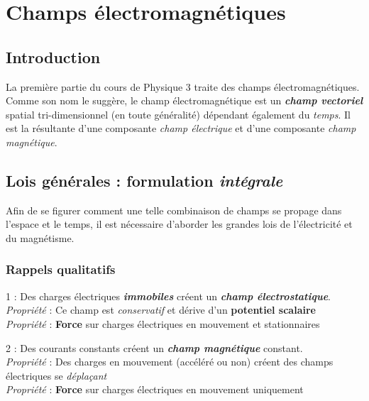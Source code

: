 
\chapter{Champs électromagnétiques} 

 
\section{Introduction}

La première partie du cours de Physique 3 traite des champs électromagnétiques. \\
Comme son nom le suggère, le champ électromagnétique est un \textit{\textbf{champ vectoriel}} spatial
tri-dimensionnel (en toute généralité) dépendant également du \textit{temps}.  Il est la résultante d'une composante \textit{champ 
électrique} et d'une composante \textit{champ magnétique}. 

\section{Lois générales : formulation \textit{intégrale}}

Afin de se figurer comment une telle combinaison de champs se propage dans l'espace et le temps, il est nécessaire d'aborder les grandes 
lois de l'électricité et du magnétisme. 

\subsection{Rappels qualitatifs}



{\huge 1} : Des charges électriques \textit{\textbf{immobiles}} créent un \textit{\textbf{champ électrostatique}}. \\
\textit{Propriété} : Ce champ est \textit{conservatif} et dérive d'un \textbf{potentiel scalaire} \\ 
\textit{Propriété} : \textbf{Force} sur charges électriques en mouvement et stationnaires 

\vspace{5mm}%

{\huge 2} : Des courants constants  créent un \textit{\textbf{champ magnétique}}  constant. \\
\textit{Propriété} : Des charges en mouvement (accéléré ou non) créent des champs électriques se \textit{déplaçant} \\
\textit{Propriété} : \textbf{Force} sur charges électriques en mouvement uniquement \\

